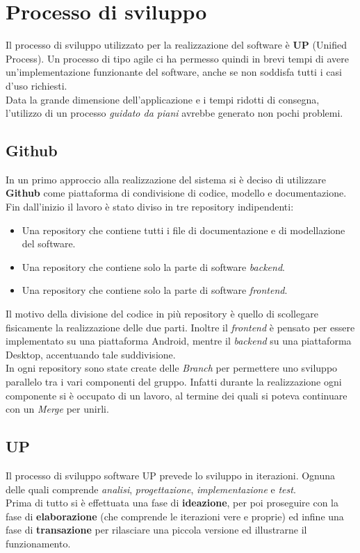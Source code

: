 \chapter{Processo di sviluppo}
Il processo di sviluppo utilizzato per la realizzazione del software è \textbf{UP} (Unified Process). Un processo di tipo agile ci ha permesso quindi in brevi tempi di avere un'implementazione funzionante del software, anche se non soddisfa tutti i casi d'uso richiesti.
\\Data la grande dimensione dell'applicazione e i tempi ridotti di consegna, l'utilizzo di un processo \textit{guidato da piani} avrebbe generato non pochi problemi.

\section{Github}
In un primo approccio alla realizzazione del sistema si è deciso di utilizzare \textbf{Github} come piattaforma di condivisione di codice, modello e documentazione. Fin dall'inizio il lavoro è stato diviso in tre repository indipendenti:
\begin{itemize}
	\item Una repository che contiene tutti i file di documentazione e di modellazione del software.
	\item Una repository che contiene solo la parte di software \textit{backend}. 
	\item Una repository che contiene solo la parte di software \textit{frontend}.
\end{itemize}
Il motivo della divisione del codice in più repository è quello di scollegare fisicamente la realizzazione delle due parti. Inoltre il \textit{frontend} è pensato per essere implementato su una piattaforma Android, mentre il \textit{backend} su una piattaforma Desktop, accentuando tale suddivisione.
\\In ogni repository sono state create delle \textit{Branch} per permettere uno sviluppo parallelo tra i vari componenti del gruppo. Infatti durante la realizzazione ogni componente si è occupato di un lavoro, al termine dei quali si poteva continuare con un \textit{Merge} per unirli.

\section{UP}
Il processo di sviluppo software UP prevede lo sviluppo in iterazioni. Ognuna delle quali comprende \textit{analisi}, \textit{progettazione}, \textit{implementazione} e \textit{test}.
\\Prima di tutto si è effettuata una fase di \textbf{ideazione}, per poi proseguire con la fase di \textbf{elaborazione} (che comprende le iterazioni vere e proprie) ed infine una fase di \textbf{transazione} per rilasciare una piccola versione ed illustrarne il funzionamento.


